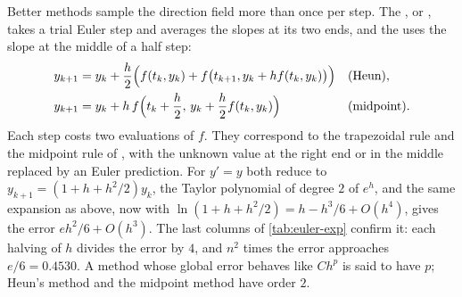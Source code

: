 Better methods sample the direction field more than once per step. The , or , takes a trial Euler step and averages the slopes at its two ends, and the  uses the slope at the middle of a half step:
\begin{align*}
y_{k+1}&=y_k+\frac h2\Bigl(f(t_k,y_k)+f\bigl(t_{k+1},y_k+hf(t_k,y_k)\bigr)\Bigr)&&\text{(Heun)},\\
y_{k+1}&=y_k+h\,f\Bigl(t_k+\frac h2,\,y_k+\frac h2f(t_k,y_k)\Bigr)&&\text{(midpoint)}.
\end{align*}
Each step costs two evaluations of $f$. They correspond to the trapezoidal rule and the midpoint rule of , with the unknown value at the right end or in the middle replaced by an Euler prediction. For $y'=y$ both reduce to $y_{k+1}=(1+h+h^2/2)y_k$, the Taylor polynomial of degree $2$ of $e^h$, and the same expansion as above, now with $\ln(1+h+h^2/2)=h-h^3/6+O(h^4)$, gives the error $eh^2/6+O(h^3)$. The last columns of \cref{tab:euler-exp} confirm it: each halving of $h$ divides the error by $4$, and $n^2$ times the error approaches $e/6=0.4530$. A method whose global error behaves like $Ch^p$ is said to have  $p$; Heun's method and the midpoint method have order $2$.

\begin{table}
\end{table}

